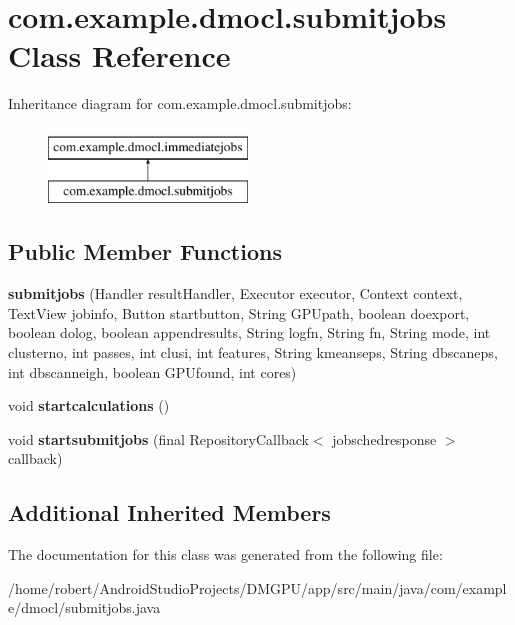 \hypertarget{classcom_1_1example_1_1dmocl_1_1submitjobs}{}\section{com.\+example.\+dmocl.\+submitjobs Class Reference}
\label{classcom_1_1example_1_1dmocl_1_1submitjobs}
Inheritance diagram for com.\+example.\+dmocl.\+submitjobs\+:\begin{figure}[H]
\begin{center}
\leavevmode
\includegraphics[height=2.000000cm]{classcom_1_1example_1_1dmocl_1_1submitjobs}
\end{center}
\end{figure}
\subsection*{Public Member Functions}
\begin{DoxyCompactItemize}
\item 
\mbox{\label{classcom_1_1example_1_1dmocl_1_1submitjobs_a482225e911b94fb9ffd69233fc457800}} 
{\bfseries submitjobs} (Handler result\+Handler, Executor executor, Context context, Text\+View jobinfo, Button startbutton, String G\+P\+Upath, boolean doexport, boolean dolog, boolean appendresults, String logfn, String fn, String mode, int clusterno, int passes, int clusi, int features, String kmeanseps, String dbscaneps, int dbscanneigh, boolean G\+P\+Ufound, int cores)
\item 
\mbox{\label{classcom_1_1example_1_1dmocl_1_1submitjobs_a79402efd281c3fe0a661998d5874791c}} 
void {\bfseries startcalculations} ()
\item 
\mbox{\label{classcom_1_1example_1_1dmocl_1_1submitjobs_ac1d6ef36ed662cda753e0d884b596a04}} 
void {\bfseries startsubmitjobs} (final Repository\+Callback$<$ jobschedresponse $>$ callback)
\end{DoxyCompactItemize}
\subsection*{Additional Inherited Members}


The documentation for this class was generated from the following file\+:\begin{DoxyCompactItemize}
\item 
/home/robert/\+Android\+Studio\+Projects/\+D\+M\+G\+P\+U/app/src/main/java/com/example/dmocl/submitjobs.\+java\end{DoxyCompactItemize}
